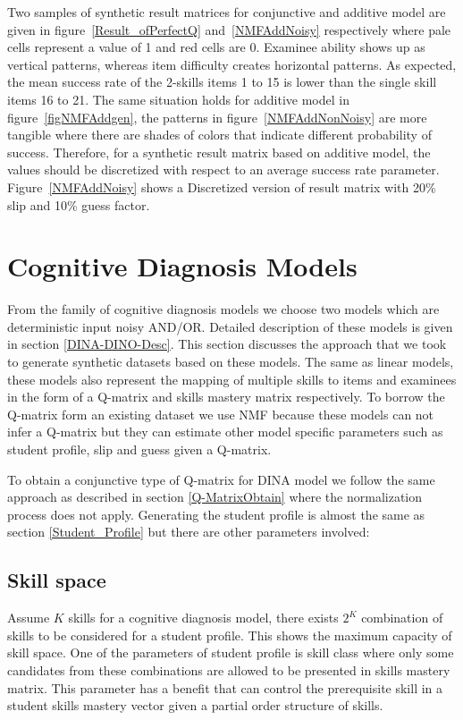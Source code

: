 Two samples of synthetic result matrices for conjunctive and additive model are given in figure~\ref{Result_ofPerfectQ} and~\ref{NMFAddNoisy} respectively where pale cells represent a value of 1 and red cells are 0. Examinee ability shows up as vertical patterns, whereas item difficulty creates horizontal patterns. As expected, the mean success rate of the 2-skills items 1 to 15 is lower than the single skill items 16 to 21. The same situation holds for additive model in figure~\ref{figNMFAddgen}, the patterns in figure~\ref{NMFAddNonNoisy} are more tangible where there are shades of colors that indicate different probability of success. Therefore, for a synthetic result matrix based on additive model, the values should be discretized with respect to an average success rate parameter. Figure~\ref{NMFAddNoisy} shows a Discretized version of result matrix with 20\% slip and 10\% guess factor.


\section{Cognitive Diagnosis Models}
\label{Syn:DINAO}

From the family of cognitive diagnosis models we choose two models which are deterministic input noisy AND/OR. Detailed description of these models is given in section \ref{DINA-DINO-Desc}. This section discusses the approach that we took to generate synthetic datasets based on these models. The same as linear models, these models also represent the mapping of multiple skills to items and examinees in the form of a Q-matrix and skills mastery matrix respectively. To borrow the Q-matrix form an existing dataset we use NMF because these models can not infer a Q-matrix but they can estimate other model specific parameters such as student profile, slip and guess given a Q-matrix. 

To obtain a conjunctive type of Q-matrix for DINA model we follow the same approach as described in section \ref{Q-MatrixObtain} where the normalization process does not apply. Generating the student profile is almost the same as section \ref{Student_Profile} but there are other parameters involved:


\subsection{Skill space}
Assume $K$ skills for a cognitive diagnosis model, there exists $2^K$ combination of skills to be considered for a student profile. This shows the maximum capacity of skill space. One of the parameters of student profile is skill class where only some candidates from these combinations are allowed to be presented in skills mastery matrix. This parameter has a benefit that can control the prerequisite skill in a student skills mastery vector given a partial order structure of skills.


